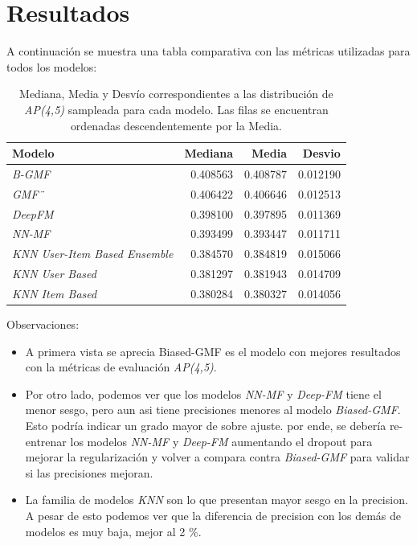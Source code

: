 \documentclass[11pt,a4paper,twoside]{thesis}
\begin{document}
\chapter{Resultados}

A continuación se muestra una tabla comparativa con las métricas utilizadas para todos los modelos:

\begin{table}[!htb]
	\centering
	\footnotesize
	\begin{tabular}{lrrr}
	\hline
		Modelo                       & Mediana  & Media    & Desvio  \\
	\hline
	\textit{B-GMF}                        & 0.408563 & 0.408787 & 0.012190 \\
	\textit{GMF¨}                          & 0.406422 & 0.406646 & 0.012513 \\
	\textit{DeepFM}                       & 0.398100 & 0.397895 & 0.011369 \\
	\textit{NN-MF}                        & 0.393499 & 0.393447 & 0.011711 \\
	\textit{KNN User-Item Based Ensemble} & 0.384570 & 0.384819 & 0.015066 \\
	\textit{KNN User Based}               & 0.381297 & 0.381943 & 0.014709 \\
	\textit{KNN Item Based}               & 0.380284 & 0.380327 & 0.014056 \\
	\hline
	\end{tabular}
	\caption{
		Mediana, Media y Desvío correspondientes a las distribución de 
		\textit{AP(4,5)} sampleada para cada modelo. Las filas se encuentran ordenadas descendentemente por la Media.
	}
	\label{table:tab}
\end{table}


\begin{description}
	\item[Observaciones:]
\end{description}
\begin{itemize}
\item A primera vista se aprecia Biased-GMF es el modelo con mejores resultados con la métricas de evaluación \textit{AP(4,5)}.
\item Por otro lado, podemos ver que los modelos \textit{NN-MF} y \textit{Deep-FM} tiene el menor sesgo, pero aun asi tiene precisiones menores al modelo \textit{Biased-GMF}. Esto podría indicar un grado mayor de sobre ajuste. por ende, se debería re-entrenar los modelos \textit{NN-MF} y \textit{Deep-FM} aumentando el dropout para mejorar la regularización y volver a compara contra \textit{Biased-GMF} para validar si las precisiones mejoran.
\item La familia de modelos \textit{KNN} son lo que presentan mayor sesgo en la precision. A pesar de esto podemos ver que la diferencia de precision con los demás de modelos es muy baja, mejor al 2 \%.
\end{itemize}
\end{document}
